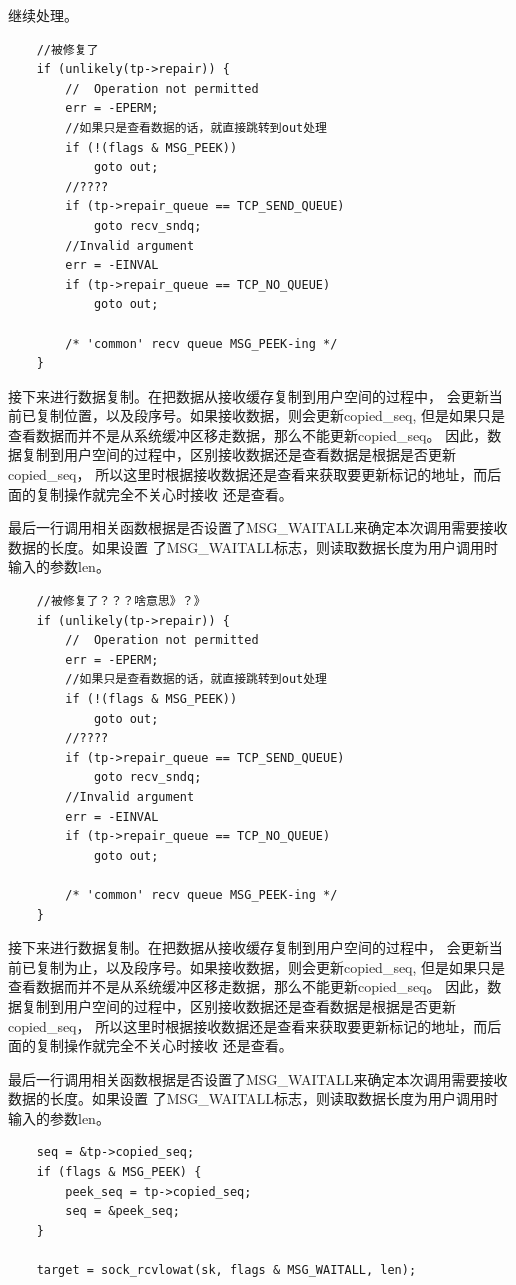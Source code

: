     继续处理。
\begin{verbatim}
	//被修复了
	if (unlikely(tp->repair)) {
		//	Operation not permitted
		err = -EPERM;
		//如果只是查看数据的话，就直接跳转到out处理
		if (!(flags & MSG_PEEK))
			goto out;
		//????
		if (tp->repair_queue == TCP_SEND_QUEUE)
			goto recv_sndq;
		//Invalid argument
		err = -EINVAL
		if (tp->repair_queue == TCP_NO_QUEUE)
			goto out;

		/* 'common' recv queue MSG_PEEK-ing */
	}
\end{verbatim}
	
	接下来进行数据复制。在把数据从接收缓存复制到用户空间的过程中，
	会更新当前已复制位置，以及段序号。如果接收数据，则会更新copied\_seq,
	但是如果只是查看数据而并不是从系统缓冲区移走数据，那么不能更新copied\_seq。
	因此，数据复制到用户空间的过程中，区别接收数据还是查看数据是根据是否更新copied\_seq，
	所以这里时根据接收数据还是查看来获取要更新标记的地址，而后面的复制操作就完全不关心时接收
	还是查看。
	
	最后一行调用相关函数根据是否设置了MSG\_WAITALL来确定本次调用需要接收数据的长度。如果设置
	了MSG\_WAITALL标志，则读取数据长度为用户调用时输入的参数len。
\begin{verbatim}
    //被修复了？？？啥意思》？》
    if (unlikely(tp->repair)) {
        //  Operation not permitted
        err = -EPERM;
        //如果只是查看数据的话，就直接跳转到out处理
        if (!(flags & MSG_PEEK))
            goto out;
        //????
        if (tp->repair_queue == TCP_SEND_QUEUE)
            goto recv_sndq;
        //Invalid argument
        err = -EINVAL
        if (tp->repair_queue == TCP_NO_QUEUE)
            goto out;

        /* 'common' recv queue MSG_PEEK-ing */
    }
\end{verbatim}
    
    接下来进行数据复制。在把数据从接收缓存复制到用户空间的过程中，
    会更新当前已复制为止，以及段序号。如果接收数据，则会更新copied\_seq,
    但是如果只是查看数据而并不是从系统缓冲区移走数据，那么不能更新copied\_seq。
    因此，数据复制到用户空间的过程中，区别接收数据还是查看数据是根据是否更新copied\_seq，
    所以这里时根据接收数据还是查看来获取要更新标记的地址，而后面的复制操作就完全不关心时接收
    还是查看。
    
    最后一行调用相关函数根据是否设置了MSG\_WAITALL来确定本次调用需要接收数据的长度。如果设置
    了MSG\_WAITALL标志，则读取数据长度为用户调用时输入的参数len。
\begin{verbatim}
    seq = &tp->copied_seq;
    if (flags & MSG_PEEK) {
        peek_seq = tp->copied_seq;
        seq = &peek_seq;
    }

    target = sock_rcvlowat(sk, flags & MSG_WAITALL, len);
\end{verbatim}

